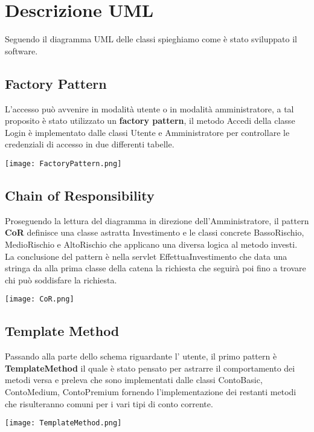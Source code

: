 \chapter{Descrizione UML} \label{cap}
\def\baselinestretch{1.66}

Seguendo il diagramma UML delle classi spieghiamo come \`{e} stato sviluppato il software.\\

\section{Factory Pattern}
L'accesso pu\`{o} avvenire in modalit\`{a} utente o in modalit\`{a} amministratore, a tal proposito \`{e} stato utilizzato un \textbf{factory pattern}, il metodo Accedi della classe Login \`{e} implementato dalle classi Utente e Amministratore per controllare le credenziali di accesso in due differenti tabelle. \\
\begin{center}
\texttt{[image: FactoryPattern.png]}
\end{center}

\section{Chain of Responsibility}
Proseguendo la lettura del diagramma in direzione dell'Amministratore, il pattern \textbf{CoR} definisce una classe astratta Investimento e le classi concrete BassoRischio, MedioRischio e AltoRischio che applicano una diversa logica al metodo investi.\\
La conclusione del pattern \`{e} nella servlet EffettuaInvestimento che data una stringa da alla prima classe della catena la richiesta che seguir\`{a} poi fino a trovare chi pu\`{o} soddisfare la richiesta. \\
\begin{center}
\texttt{[image: CoR.png]}
\end{center}

\section{Template Method}
Passando alla parte dello schema riguardante l' utente, il primo pattern \`{e} \textbf{TemplateMethod} il quale \`{e} stato pensato per astrarre il comportamento dei metodi versa e preleva che sono implementati dalle classi ContoBasic, ContoMedium, ContoPremium fornendo l'implementazione dei restanti metodi che risulteranno comuni per i vari tipi di conto corrente.\\
\begin{center}
\texttt{[image: TemplateMethod.png]}
\end{center}


